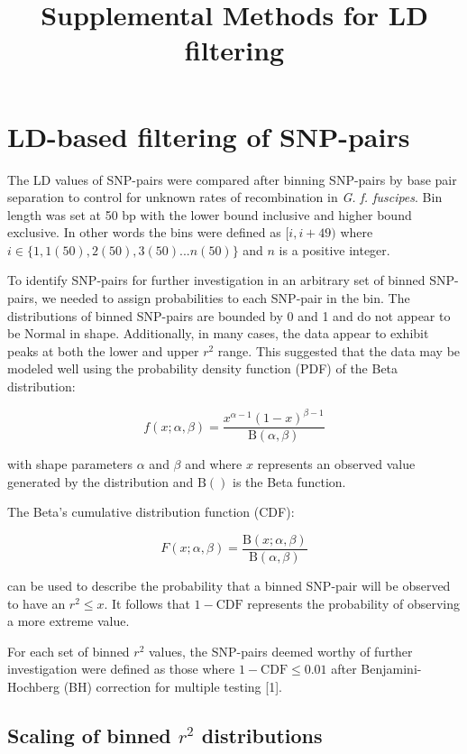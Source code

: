 \documentclass[letterpaper]{scrartcl}
\title{Supplemental Methods for LD filtering}
\date{}
\begin{document}
\maketitle

{
\hypersetup{linkcolor=black}
\setcounter{tocdepth}{3}
\tableofcontents
}
\section{LD-based filtering of
SNP-pairs}\label{ld-based-filtering-of-snp-pairs}

The LD values of SNP-pairs were compared after binning SNP-pairs by base
pair separation to control for unknown rates of recombination in
\emph{G. f. fuscipes}. Bin length was set at 50 bp with the lower bound
inclusive and higher bound exclusive. In other words the bins were
defined as \([i, i + 49)\) where
\(i \in \{1,1(50),2(50),3(50) ... n(50)\}\) and \(n\) is a positive
integer.

To identify SNP-pairs for further investigation in an arbitrary set of
binned SNP-pairs, we needed to assign probabilities to each SNP-pair in
the bin. The distributions of binned SNP-pairs are bounded by 0 and 1
and do not appear to be Normal in shape. Additionally, in many cases,
the data appear to exhibit peaks at both the lower and upper \(r^2\)
range. This suggested that the data may be modeled well using the
probability density function (PDF) of the Beta distribution:

\[f(x;\alpha,\beta) = \frac{x^{\alpha-1}(1-x)^{\beta-1}} {\mathrm{B}(\alpha,\beta)}\]

with shape parameters \(\alpha\) and \(\beta\) and where \(x\)
represents an observed value generated by the distribution and
\(\mathrm{B}()\) is the Beta function.

The Beta's cumulative distribution function (CDF):

\[F(x;\alpha,\beta) = \frac{\mathrm{B}(x;\alpha,\beta)}{\mathrm{B}(\alpha,\beta)} \]

can be used to describe the probability that a binned SNP-pair will be
observed to have an \(r^2 \le x\). It follows that \(1-\mathrm{CDF}\)
represents the probability of observing a more extreme value.

For each set of binned \(r^2\) values, the SNP-pairs deemed worthy of
further investigation were defined as those where
\(1-\mathrm{CDF} \le 0.01\) after Benjamini-Hochberg (BH) correction for
multiple testing {[}1{]}.

\subsection{Scaling of binned \(r^2\)
distributions}\label{scaling-of-binned-r2-distributions}
\end{document}
